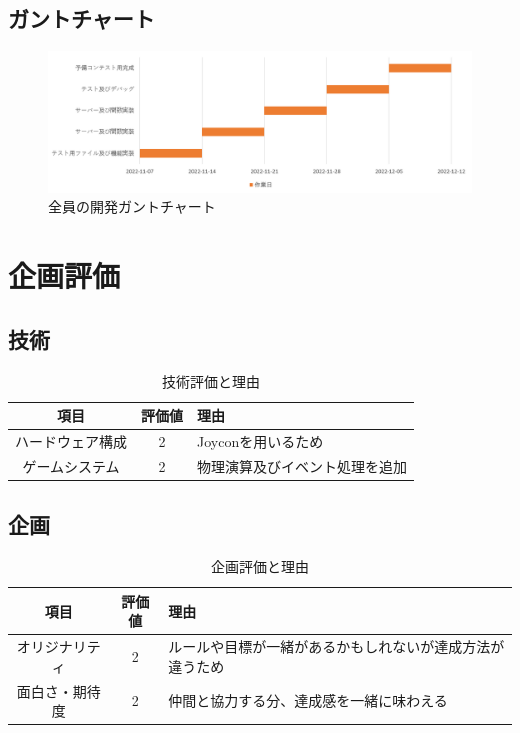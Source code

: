 \documentclass{jsarticle}
\begin{document}
\subsection{ガントチャート}
\begin{figure}[hbt]
	\begin{center}
	\centering
	\includegraphics[scale=0.50]{gant.png}
	\caption{全員の開発ガントチャート}
	\label{fig:gc}
	\end{center}
	\end{figure}

\section{企画評価}
\subsection{技術}
\begin{table}[hbt]
	\begin{center}
	\caption{技術評価と理由}
	\label{table1}
	\begin{tabular}{|c|c|l|}\hline
	項目 & 評価値 & 理由 \\ \hline\hline
	ハードウェア構成 & 2 & Joyconを用いるため \\ \hline
	ゲームシステム & 2 & 物理演算及びイベント処理を追加 \\ \hline
	\end{tabular}
	\end{center}
	\end{table}
\subsection{企画}
\begin{table}[hbt]
	\begin{center}
	\caption{企画評価と理由}
	\label{table2}
	\begin{tabular}{|c|c|l|}\hline
	項目 & 評価値 & 理由 \\ \hline\hline
	オリジナリティ & 2 & ルールや目標が一緒があるかもしれないが達成方法が違うため \\ \hline
	面白さ・期待度 & 2 & 仲間と協力する分、達成感を一緒に味わえる\\ \hline
	\end{tabular}
	\end{center}
	\end{table}
\end{document}
